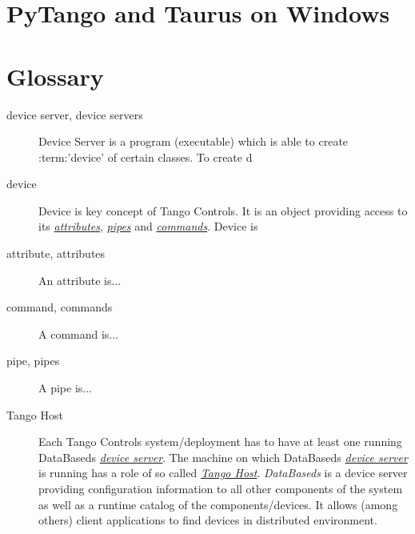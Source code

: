 \documentclass[letterpaper,10pt,english]{sphinxmanual}
\begin{document}
\chapter{PyTango and Taurus on Windows}
\label{pytango-and-taurus-on-windows:pytango-and-taurus-on-windows}\label{pytango-and-taurus-on-windows::doc}

\chapter{Glossary}
\label{glossary:glossary}\label{glossary::doc}\label{glossary:index-0}\begin{description}
\item[{device server, device servers}] \leavevmode{}\label{glossary:term-device-server}
Device Server is a program (executable) which is able to create :term:'device' of certain classes. To create d

\item[{device}] \leavevmode{}\label{glossary:term-device}
Device is key concept of Tango Controls. It is an object providing access to its {\hyperref[glossary:term-attributes]{\emph{attributes}}},
{\hyperref[glossary:term-pipes]{\emph{pipes}}} and {\hyperref[glossary:term-commands]{\emph{commands}}}. Device is

\item[{attribute, attributes}] \leavevmode{}\label{glossary:term-attribute}
An attribute is...

\item[{command, commands}] \leavevmode{}\label{glossary:term-command}
A command is...

\item[{pipe, pipes}] \leavevmode{}\label{glossary:term-pipe}
A pipe is...

\item[{Tango Host}] \leavevmode{}\label{glossary:term-tango-host}
Each Tango Controls system/deployment has to have at least one running DataBaseds {\hyperref[glossary:term-device-server]{\emph{device server}}}.
The machine on which DataBaseds {\hyperref[glossary:term-device-server]{\emph{device server}}} is running has a role of so called {\hyperref[glossary:term-tango-host]{\emph{Tango Host}}}.
\emph{DataBaseds} is a device server providing configuration information to all other components of the system as
well as a runtime catalog of the components/devices. It allows (among others) client applications to find
devices in distributed environment.

\end{description}
\end{document}
